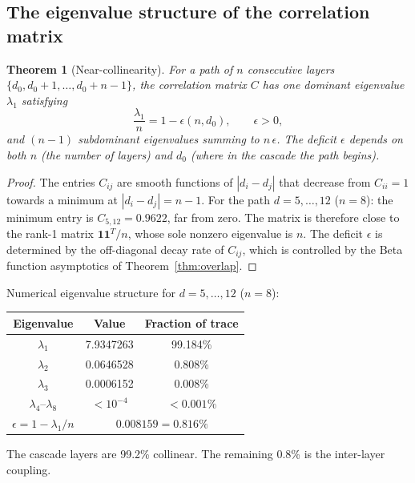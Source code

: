 \documentclass[12pt,a4paper]{article}
\newtheorem{theorem}{Theorem}[section]
\theoremstyle{remark}
\begin{document}
\subsection{The eigenvalue structure of the correlation matrix}

\begin{theorem}[Near-collinearity]\label{thm:eigenvalue}
For a path of $n$ consecutive layers $\{d_0, d_0+1, \ldots, d_0+n-1\}$, the correlation matrix $C$ has one dominant eigenvalue $\lambda_1$ satisfying
\[
\frac{\lambda_1}{n} = 1 - \epsilon(n, d_0), \qquad \epsilon > 0,
\]
and $(n - 1)$ subdominant eigenvalues summing to $n\,\epsilon$. The deficit $\epsilon$ depends on both $n$ (the number of layers) and $d_0$ (where in the cascade the path begins).
\end{theorem}

\begin{proof}
The entries $C_{ij}$ are smooth functions of $|d_i - d_j|$ that decrease from $C_{ii} = 1$ towards a minimum at $|d_i - d_j| = n - 1$. For the path $d = 5, \ldots, 12$ ($n = 8$): the minimum entry is $C_{5,12} = 0.9622$, far from zero. The matrix is therefore close to the rank-1 matrix $\mathbf{1}\mathbf{1}^T/n$, whose sole nonzero eigenvalue is $n$. The deficit $\epsilon$ is determined by the off-diagonal decay rate of $C_{ij}$, which is controlled by the Beta function asymptotics of Theorem~\ref{thm:overlap}.
\end{proof}

\noindent Numerical eigenvalue structure for $d = 5, \ldots, 12$ ($n = 8$):

\begin{center}
\renewcommand{\arraystretch}{1.2}
\begin{tabular}{ccc}
\toprule
Eigenvalue & Value & Fraction of trace \\
\midrule
$\lambda_1$ & 7.9347263 & 99.184\% \\
$\lambda_2$ & 0.0646528 & 0.808\% \\
$\lambda_3$ & 0.0006152 & 0.008\% \\
$\lambda_4$--$\lambda_8$ & $< 10^{-4}$ & $< 0.001\%$ \\
\midrule
$\epsilon = 1 - \lambda_1/n$ & \multicolumn{2}{c}{$0.008159 = 0.816\%$} \\
\bottomrule
\end{tabular}
\end{center}

\noindent The cascade layers are 99.2\% collinear. The remaining 0.8\% is the inter-layer coupling.
\end{document}
